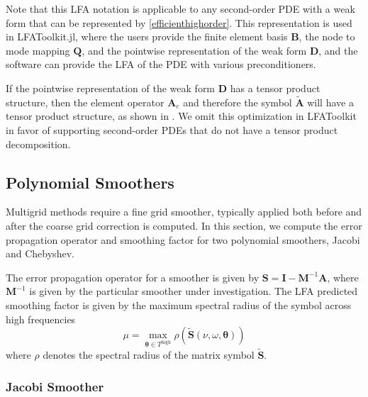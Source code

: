 \documentclass[review]{siamart190516}
\begin{document}
Note that this LFA notation is applicable to any second-order PDE with a weak form that can be represented by \cref{efficienthighorder}.
This representation is used in LFAToolkit.jl, where the users provide the finite element basis $\mathbf{B}$, the node to mode mapping $\mathbf{Q}$, and the pointwise representation of the weak form $\mathbf{D}$, and the software can provide the LFA of the PDE with various preconditioners.

If the pointwise representation of the weak form $\mathbf{D}$ has a tensor product structure, then the element operator $\mathbf{A}_e$ and therefore the symbol $\tilde{\mathbf{A}}$ will have a tensor product structure, as shown in \cite{he2020two}.
We omit this optimization in LFAToolkit in favor of supporting second-order PDEs that do not have a tensor product decomposition.

\subsection{Polynomial Smoothers}\label{sec:smooth}

Multigrid methods require a fine grid smoother, typically applied both before and after the coarse grid correction is computed.
In this section, we compute the error propagation operator and smoothing factor for two polynomial smoothers, Jacobi and Chebyshev.

The error propagation operator for a smoother is given by $\mathbf{S} = \mathbf{I} - \mathbf{M}^{-1} \mathbf{A}$, where $\mathbf{M}^{-1}$ is given by the particular smoother under investigation.
The LFA predicted smoothing factor is given by the maximum spectral radius of the symbol across high frequencies
\begin{equation}
\mu = \max_{\boldsymbol{\theta} \in T^{\text{high}}} \rho \left( \tilde{\mathbf{S}} \left( \nu, \omega, \boldsymbol{\theta} \right) \right)
\end{equation}
where $\rho$ denotes the spectral radius of the matrix symbol $\tilde{\mathbf{S}}$.

\subsubsection{Jacobi Smoother}\label{sec:jacobi}
\end{document}
